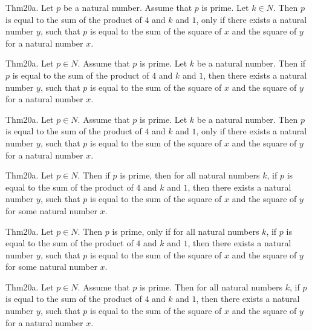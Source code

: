 \documentclass{article}
\begin{document}
Thm20a. Let $p$ be a natural number. Assume that $p$ is prime. Let $k \in N$. Then $p$ is equal to the sum of the product of $4$ and $k$ and $1$, only if there exists a natural number $y$, such that $p$ is equal to the sum of the square of $x$ and the square of $y$ for a natural number $x$.

Thm20a. Let $p \in N$. Assume that $p$ is prime. Let $k$ be a natural number. Then if $p$ is equal to the sum of the product of $4$ and $k$ and $1$, then there exists a natural number $y$, such that $p$ is equal to the sum of the square of $x$ and the square of $y$ for a natural number $x$.

Thm20a. Let $p \in N$. Assume that $p$ is prime. Let $k$ be a natural number. Then $p$ is equal to the sum of the product of $4$ and $k$ and $1$, only if there exists a natural number $y$, such that $p$ is equal to the sum of the square of $x$ and the square of $y$ for a natural number $x$.

Thm20a. Let $p \in N$. Then if $p$ is prime, then for all natural numbers $k$, if $p$ is equal to the sum of the product of $4$ and $k$ and $1$, then there exists a natural number $y$, such that $p$ is equal to the sum of the square of $x$ and the square of $y$ for some natural number $x$.

Thm20a. Let $p \in N$. Then $p$ is prime, only if for all natural numbers $k$, if $p$ is equal to the sum of the product of $4$ and $k$ and $1$, then there exists a natural number $y$, such that $p$ is equal to the sum of the square of $x$ and the square of $y$ for some natural number $x$.

Thm20a. Let $p \in N$. Assume that $p$ is prime. Then for all natural numbers $k$, if $p$ is equal to the sum of the product of $4$ and $k$ and $1$, then there exists a natural number $y$, such that $p$ is equal to the sum of the square of $x$ and the square of $y$ for a natural number $x$.
\end{document}
